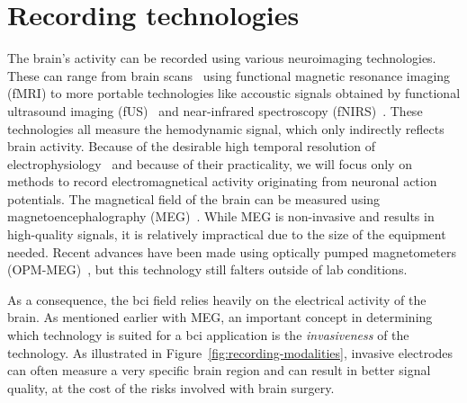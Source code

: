 

\section{Recording technologies}
\label{sec:bci-recording}


The brain's activity can be recorded using various neuroimaging
technologies.
These can range from brain scans~\cite{Weiskopf2004} using functional magnetic resonance imaging
(fMRI) to more portable technologies like accoustic signals obtained by functional ultrasound imaging
(fUS)~\cite{Zheng2023} and near-infrared spectroscopy
(fNIRS)~\cite{Borgheai2020}.
These technologies all measure the hemodynamic signal, which only indirectly
reflects brain activity.
Because of the desirable high temporal resolution of
electrophysiology~\cite{Easttom2021} and
because of their practicality, we will focus only on methods to record
electromagnetical activity originating from neuronal action potentials.
The magnetical field of the brain can be measured using magnetoencephalography
(MEG)~\cite{Mellinger2007}.
While MEG is non-invasive and results in high-quality signals, it is relatively
impractical due to the size of the equipment needed.
Recent advances have been made using optically pumped magnetometers
(OPM-MEG)~\cite{Wittevrongel2021}, but this technology still falters outside of
lab conditions.

As a consequence, the \ac{bci} field relies heavily on the
electrical activity of the brain.
As mentioned earlier with MEG, an important concept in determining which
technology is suited for a \ac{bci} application is the \emph{invasiveness} of the technology.
As illustrated in Figure~\ref{fig:recording-modalities}, invasive electrodes can often measure a very specific brain region and can result in better signal quality, at the cost of the risks
involved with brain surgery.

